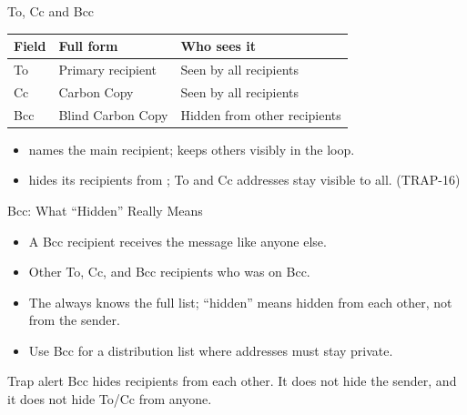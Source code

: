 \documentclass[aspectratio=169]{beamer}
\begin{document}
\begin{frame}{To, Cc and Bcc}
  \begin{center}
    \begin{tabular}{p{}p{}p{}}
      \toprule
      \textbf{Field} & \textbf{Full form} & \textbf{Who sees it} \\
      \midrule
      To & Primary recipient & Seen by all recipients \\
      Cc & Carbon Copy & Seen by all recipients \\
      Bcc & Blind Carbon Copy & Hidden from other recipients \\
      \bottomrule
    \end{tabular}
  \end{center}
  \vspace{0.25cm}
  \begin{itemize}
    \item {} names the main recipient;  keeps others visibly in
      the loop.
    \item {} hides its recipients from ; To and Cc
      addresses stay visible to all. (TRAP-16)
  \end{itemize}
\end{frame}

\begin{frame}{Bcc: What ``Hidden'' Really Means}
  \begin{itemize}
    \item A Bcc recipient receives the message like anyone else.
    \item Other To, Cc, and Bcc recipients  who was on Bcc.
    \item The  always knows the full list; ``hidden'' means hidden
      from each other, not from the sender.
    \item Use Bcc for a  distribution list where
      addresses must stay private.
  \end{itemize}
  \begin{alertblock}{Trap alert}
    Bcc hides recipients from each other. It does not hide the sender, and it
    does not hide To/Cc from anyone.
  \end{alertblock}
\end{frame}
\end{document}
